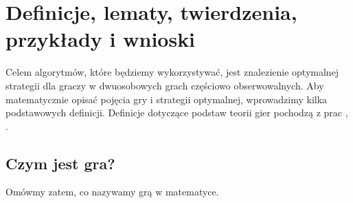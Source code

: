 \documentclass[inzynierska]{pwr_wmat_praca_dyplomowa}
\theoremstyle{plain}
\numberwithin{theorem}{chapter}
\theoremstyle{definition}
\numberwithin{theorem}{chapter}
\begin{document}
%
%
%
%
%
%
%                     


\chapter{Definicje, lematy, twierdzenia, przykłady i wnioski}
Celem algorytmów, które będziemy wykorzystywać, jest znalezienie optymalnej strategii dla graczy w dwuosobowych grach częściowo obserwowalnych. Aby matematycznie opisać pojęcia gry i strategii optymalnej, wprowadzimy kilka podstawowych definicji.
Definicje dotyczące podstaw teorii gier pochodzą z prac \cite{platkowski2012wstkep}, \cite{prisner2014game}.

\section{Czym jest gra?}
Omówmy zatem, co nazywamy grą w matematyce.
\end{document}
